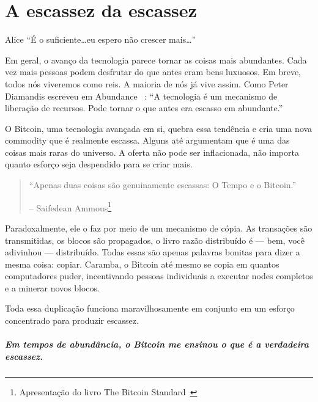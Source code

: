 
\chapter{A escassez da escassez}
\label{les:2}

\begin{chapquote}{Alice}
\enquote{É o suficiente\ldots eu espero não crescer mais\ldots}
\end{chapquote}

Em geral, o avanço da tecnologia parece tornar as coisas mais abundantes. Cada vez mais pessoas podem desfrutar do que antes eram bens luxuosos. Em breve, todos nós viveremos como reis. A maioria de nós já vive assim. Como Peter Diamandis escreveu em Abundance ~\cite{abundance}: \enquote{A tecnologia é um mecanismo de liberação de recursos. Pode tornar o que antes era escasso em abundante.}

O Bitcoin, uma tecnologia avançada em si, quebra essa tendência e cria uma nova commodity que é realmente escassa. Alguns até argumentam que é uma das coisas mais raras do universo. A oferta não pode ser inflacionada, não importa quanto esforço seja despendido para se criar mais.

\begin{quotation}\begin{samepage}
\enquote{Apenas duas coisas são genuinamente escassas: O Tempo e o Bitcoin.}
\begin{flushright} -- Saifedean Ammous\footnote{Apresentação do livro The Bitcoin Standard~\cite{bitcoinstandard-pres}}
\end{flushright}\end{samepage}\end{quotation}

Paradoxalmente, ele o faz por meio de um mecanismo de cópia. As transações são transmitidas, os blocos são propagados, o livro razão distribuído é --- bem, você adivinhou --- distribuído. Todas essas são apenas palavras bonitas para dizer a mesma coisa: copiar. Caramba, o Bitcoin até mesmo se copia em quantos computadores puder, incentivando pessoas individuais a executar nodes completos e a minerar novos blocos.

Toda essa duplicação funciona maravilhosamente em conjunto em um esforço concentrado para produzir escassez.

\paragraph{Em tempos de abundância, o Bitcoin me ensinou o que é a verdadeira escassez.}

